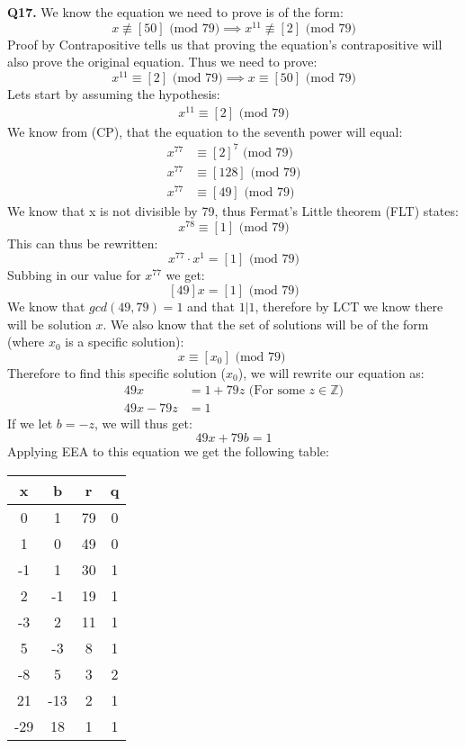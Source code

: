 \documentclass[11pt]{article}
\begin{document}
\parindent=0pt

\textbf{Q17.} We know the equation we need to prove is of the form:
\[ x \not\equiv [50] \text{ (mod 79)} \implies x^{11} \not\equiv [2] \text{ (mod 79)} \]
Proof by Contrapositive tells us that proving the equation's contrapositive will also prove the original equation. Thus we need to prove:
\[ x^{11} \equiv [2] \text{ (mod 79)}  \implies x \equiv [50] \text{ (mod 79)} \]
Lets start by assuming the hypothesis:
\begin{align*}
 x^{11} \equiv [2] \text{ (mod 79)} 
\end{align*}
We know from (CP), that the equation to the seventh power will equal:
\begin{align*}
 x^{77} &\equiv [2]^7 \text{ (mod 79)} \\
 x^{77} &\equiv [128] \text{ (mod 79)} \\
 x^{77} &\equiv [49] \text{ (mod 79)} 
\end{align*}
We know that x is not divisible by 79, thus Fermat's Little theorem (FLT) states: 
\[ x^{78} \equiv [1] \text{ (mod 79)} \] 
This can thus be rewritten:
\[ x^{77}\cdot x^1 = [1] \text{ (mod 79)} \]
Subbing in our value for $x^{77}$ we get:
\[ [49]x = [1] \text{ (mod 79)} \]
We know that $gcd(49,79) = 1$ and that $1|1$, therefore by LCT we know there will be solution $x$. We also know that the set of solutions will be of the form (where $x_0$ is a specific solution):
\[ x \equiv [x_0] \text{ (mod 79) } \]
Therefore to find this specific solution ($x_0$), we will rewrite our equation as: 
\begin{align*}
 49x & = 1 + 79z \text{ (For some $z \in \mathbb{Z}$)}  \\
 49x - 79z  &= 1 
\end{align*}
If we let $b = -z$, we will thus get:
\[  49x + 79b  = 1 \]
Applying EEA to this equation we get the following table:
\begin{center}
 \begin{tabular}{||c c c c||} 
 \hline
 x & b & r & q \\ [0.5ex] 
 \hline\hline
 0 & 1 & 79 & 0 \\ 
 \hline
 1 & 0 & 49 & 0 \\
 \hline
 -1 & 1 & 30 & 1 \\
 \hline
 2 & -1 & 19 & 1\\
 \hline
 -3 & 2 & 11 & 1\\ 
 \hline
 5 & -3  & 8 & 1 \\
 \hline
 -8 & 5 & 3 & 2 \\ 
 \hline
21 & -13 & 2 & 1\\ 
 \hline
-29 & 18 & 1 & 1\\ 
 \hline
\end{tabular}
\end{center}
\end{document}
